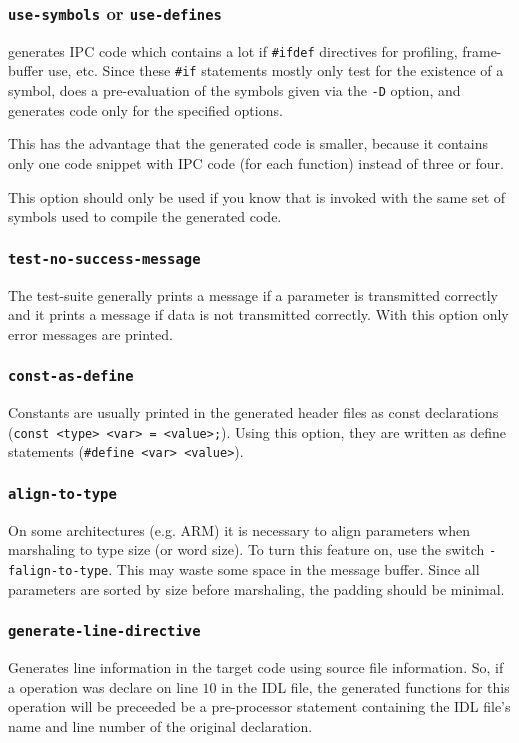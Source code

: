 \subsubsection{{\tt use-symbols} or {\tt use-defines}}
\dice{} generates IPC code which contains a lot if \verb|#ifdef|
directives for profiling, frame-buffer use, etc. Since these \verb|#if|
statements mostly only test for the existence of a symbol, \dice{}
does a pre-evaluation of the symbols given via the {\tt -D} option,
and generates code only for the specified options.

This has the advantage that the generated code is smaller, because it
contains only one code snippet with IPC code (for each function) instead
of three or four.

This option should only be used if you know that \dice{} is invoked with
the same set of symbols used to compile the generated code.

\subsubsection{{\tt test-no-success-message}}
The test-suite generally prints a message if a parameter is transmitted 
correctly and it prints a message if data is not transmitted correctly.
With this option only error messages are printed.

\subsubsection{\tt const-as-define}
Constants are usually printed in the generated header files as const
declarations (\verb|const <type> <var> = <value>;|). Using this option,
they are written as define statements (\verb|#define <var> <value>|).

\subsubsection{\tt align-to-type}
On some architectures (e.g. ARM) it is necessary to align parameters 
when marshaling to type size (or word size). To turn this feature on,
use the switch \verb|-falign-to-type|. This may waste some space in the
message buffer. Since all parameters are sorted by size before marshaling,
the padding should be minimal.

\subsubsection{\tt generate-line-directive}
Generates line information in the target code using source file
information.  So, if a operation was declare on line $10$ in the
IDL file, the generated functions for this operation will be preceeded
be a pre-processor statement containing the IDL file's name and
line number of the original declaration.

